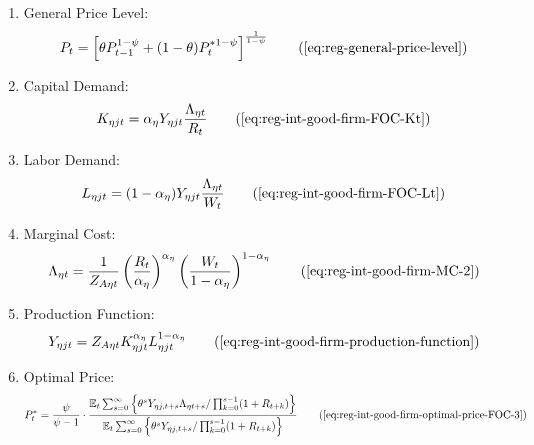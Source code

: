 \documentclass[
	thesis.tex
	]{subfiles}
\begin{document}
{\begin{itemize}
\begin{enumerate}
			\item General Price Level:
			\begin{align}
				P_t = \left[ \theta P_{t-1}^{1-\psi} + (1-\theta) P_t^{\ast 1-\psi} \right]^\frac{1}{1-\psi}
				\tag{\ref{eq:reg-general-price-level}}
			\end{align}
			
			\item Capital Demand:
			\begin{align}
				K_{\eta jt} = {\alpha_\eta} Y_{\eta jt} \frac{\Lambda_{\eta t}}{R_t}
				\tag{\ref{eq:reg-int-good-firm-FOC-Kt}}
			\end{align}
			
			\item Labor Demand:
			\begin{align}
				L_{\eta jt} = (1-{\alpha_\eta}) Y_{\eta jt} \frac{\Lambda_{\eta t}}{W_t}
				\tag{\ref{eq:reg-int-good-firm-FOC-Lt}}
			\end{align}
			
			
			\item Marginal Cost:
			\begin{align}
				\Lambda_{\eta t} = \frac{1}{Z_{A\eta t}} \left( \frac{R_t}{{\alpha_\eta}} \right)^{{\alpha_\eta}} \left( \frac{W_t}{1-{\alpha_\eta}} \right)^{1-{\alpha_\eta}}
				\tag{\ref{eq:reg-int-good-firm-MC-2}}
			\end{align}
			
			\item Production Function:
			\begin{align}
				Y_{\eta jt} = Z_{A\eta t} K_{\eta jt}^{\alpha_\eta} L_{\eta jt}^{1-{\alpha_\eta}}
				\tag{\ref{eq:reg-int-good-firm-production-function}}
			\end{align}
			
			\item Optimal Price:
			\begin{align}
				P_t^\ast = \frac{\psi}{\psi-1} \cdot \frac{ \E \sum_{s=0}^{\infty} \left\{ \theta^s Y_{\eta j,t+s} \Lambda_{\eta t+s} / \prod_{k=0}^{s-1}(1+R_{t+k}) \right\} } {\E \sum_{s=0}^{\infty} \left\{ \theta^s Y_{\eta j,t+s} / \prod_{k=0}^{s-1}(1 + R_{t+k}) \right\}} \tag{\ref{eq:reg-int-good-firm-optimal-price-FOC-3}}
			\end{align}
			

\end{enumerate}
\end{itemize}}
\end{document}
